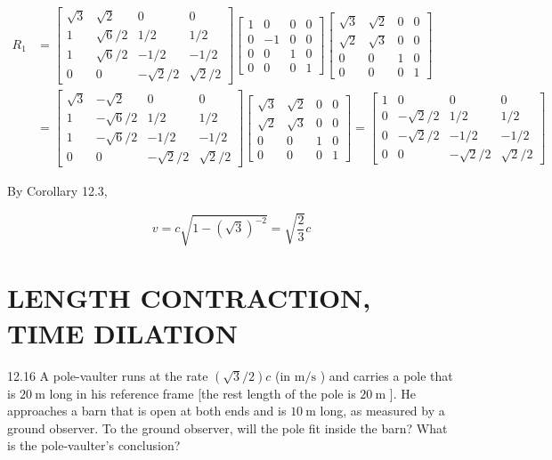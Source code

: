 \documentclass[10pt]{article}
\begin{document}
$$
\begin{aligned}
R_{1} & =\left[\begin{array}{cccc}
\sqrt{3} & \sqrt{2} & 0 & 0 \\
1 & \sqrt{6} / 2 & 1 / 2 & 1 / 2 \\
1 & \sqrt{6} / 2 & -1 / 2 & -1 / 2 \\
0 & 0 & -\sqrt{2} / 2 & \sqrt{2} / 2
\end{array}\right]\left[\begin{array}{cccc}
1 & 0 & 0 & 0 \\
0 & -1 & 0 & 0 \\
0 & 0 & 1 & 0 \\
0 & 0 & 0 & 1
\end{array}\right]\left[\begin{array}{cccc}
\sqrt{3} & \sqrt{2} & 0 & 0 \\
\sqrt{2} & \sqrt{3} & 0 & 0 \\
0 & 0 & 1 & 0 \\
0 & 0 & 0 & 1
\end{array}\right] \\
& =\left[\begin{array}{cccc}
\sqrt{3} & -\sqrt{2} & 0 & 0 \\
1 & -\sqrt{6} / 2 & 1 / 2 & 1 / 2 \\
1 & -\sqrt{6} / 2 & -1 / 2 & -1 / 2 \\
0 & 0 & -\sqrt{2} / 2 & \sqrt{2} / 2
\end{array}\right]\left[\begin{array}{cccc}
\sqrt{3} & \sqrt{2} & 0 & 0 \\
\sqrt{2} & \sqrt{3} & 0 & 0 \\
0 & 0 & 1 & 0 \\
0 & 0 & 0 & 1
\end{array}\right]=\left[\begin{array}{cccc}
1 & 0 & 0 & 0 \\
0 & -\sqrt{2} / 2 & 1 / 2 & 1 / 2 \\
0 & -\sqrt{2} / 2 & -1 / 2 & -1 / 2 \\
0 & 0 & -\sqrt{2} / 2 & \sqrt{2} / 2
\end{array}\right]
\end{aligned}
$$

By Corollary 12.3,

$$
v=c \sqrt{1-(\sqrt{3})^{-2}}=\sqrt{\frac{2}{3}} c
$$

\section*{LENGTH CONTRACTION, TIME DILATION}
12.16 A pole-vaulter runs at the rate $(\sqrt{3} / 2) c$ (in $\mathrm{m} / \mathrm{s}$ ) and carries a pole that is $20 \mathrm{~m}$ long in his reference frame [the rest length of the pole is $20 \mathrm{~m}$ ]. He approaches a barn that is open at both ends and is $10 \mathrm{~m}$ long, as measured by a ground observer. To the ground observer, will the pole fit inside the barn? What is the pole-vaulter's conclusion?
\end{document}

